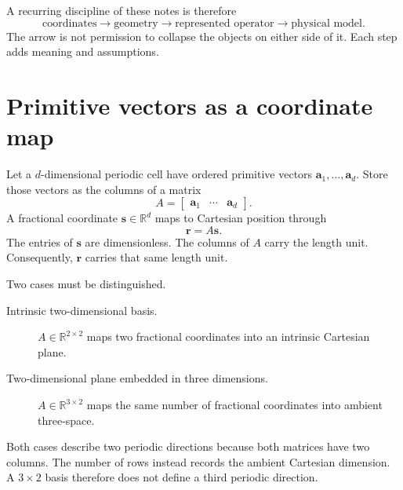 A recurring discipline of these notes is therefore
\begin{equation}
  \text{coordinates}
  \longrightarrow
  \text{geometry}
  \longrightarrow
  \text{represented operator}
  \longrightarrow
  \text{physical model}.
  \label{eq:training-geometry-layer-sequence}
\end{equation}
The arrow is not permission to collapse the objects on either side of it. Each
step adds meaning and assumptions.

\section{Primitive vectors as a coordinate map}

Let a $d$-dimensional periodic cell have ordered primitive vectors
$\mathbf a_1,\ldots,\mathbf a_d$. Store those vectors as the columns of a
matrix
\begin{equation}
  A=
  \begin{bmatrix}
    \mathbf a_1 & \cdots & \mathbf a_d
  \end{bmatrix}.
  \label{eq:training-direct-basis}
\end{equation}
A fractional coordinate $\mathbf s\in\mathbb R^d$ maps to Cartesian position
through
\begin{equation}
  \mathbf r=A\mathbf s.
  \label{eq:training-fractional-to-cartesian}
\end{equation}
The entries of $\mathbf s$ are dimensionless. The columns of $A$ carry the
length unit. Consequently, $\mathbf r$ carries that same length unit.

Two cases must be distinguished.

\begin{description}
  \item[Intrinsic two-dimensional basis.] $A\in\mathbb R^{2\times2}$ maps two
    fractional coordinates into an intrinsic Cartesian plane.
  \item[Two-dimensional plane embedded in three dimensions.]
    $A\in\mathbb R^{3\times2}$ maps the same number of fractional coordinates
    into ambient three-space.
\end{description}

Both cases describe two periodic directions because both matrices have two
columns. The number of rows instead records the ambient Cartesian dimension.
A $3\times2$ basis therefore does not define a third periodic direction.

